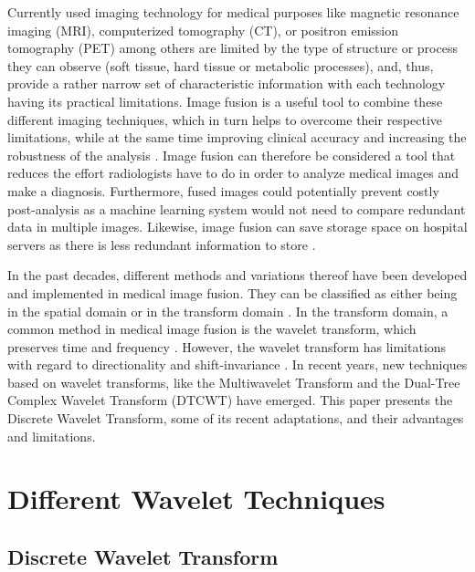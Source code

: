\documentclass{article}
\begin{document}
Currently used imaging technology for medical purposes like magnetic resonance imaging (MRI), computerized tomography (CT), or positron emission tomography (PET) among others are limited by the type of structure or process they can observe (soft tissue, hard tissue or metabolic processes), and, thus, provide a rather narrow set of characteristic information with each technology having its practical limitations. Image fusion is a useful tool to combine these different imaging techniques, which in turn helps to overcome their respective limitations, while at the same time improving clinical accuracy and increasing the robustness of the analysis \cite{DBLP:journals/corr/JamesD14}. Image fusion can therefore be considered a tool that reduces the effort radiologists have to do in order to analyze medical images and make a diagnosis. Furthermore, fused images could potentially prevent costly post-analysis as a machine learning system would not need to compare redundant data in multiple images. Likewise, image fusion can save storage space on hospital servers as there is less redundant information to store \cite{Bhateja.2015}.

In the past decades, different methods and variations thereof have been developed and implemented in medical image fusion. They can be classified as either being in the spatial domain or in the transform domain \cite{K.Padmavathi.2016}. In the transform domain, a common method in medical image fusion is the wavelet transform, which preserves time and frequency \cite{Kaur.2015, K.Padmavathi.2016, Agarwal.2015}.
However, the wavelet transform has limitations with regard to directionality and shift-invariance \cite{Bhateja.2015, Agarwal.2015}. In recent years, new techniques based on wavelet transforms, like the Multiwavelet Transform \cite{Wang2004} and the Dual-Tree Complex Wavelet Transform (DTCWT)  \cite{K.Padmavathi.2016, Talbi.2018} have emerged. This paper presents the Discrete Wavelet Transform, some of its recent adaptations, and their advantages and limitations.


\section{Different Wavelet Techniques}
\label{sec:DiffWaveTrans}

\subsection{Discrete Wavelet Transform}
\label{sec:DWT}
\end{document}
